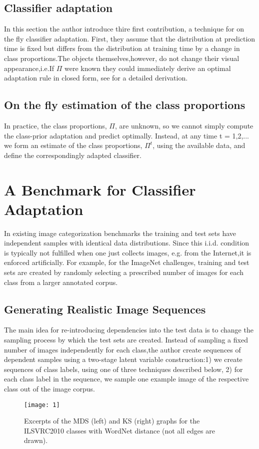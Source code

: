 \documentclass[10pt,twocolumn,letterpaper]{article}
\begin{document}
\subsection{Classifier adaptation}
In this section the author introduce thire first contribution, a technique for on the fly classifier adaptation. First, they assume that the distribution at prediction time is fixed but differs from the distribution at training time by a change in class proportions.The objects themselves,however, do not change their visual appearance,i.e.If $\Pi$ were known they could immediately derive an optimal adaptation rule in closed form, see\cite{saerens2002adjusting} for a detailed derivation.
\subsection{On the fly estimation of the class proportions}
In practice, the class proportions, $\Pi$, are unknown, so we cannot simply compute the class-prior adaptation and predict optimally. Instead, at any time t = 1,2,... we form an estimate of the class proportions, $\Pi^t$, using the available data, and define the correspondingly adapted classifier.
\section{A Benchmark for Classifier Adaptation}
In existing image categorization benchmarks the training and test sets have independent samples with identical data distributions. Since this i.i.d. condition is typically not fulfilled when one just collects images, e.g. from the Internet,it is enforced artificially. For example, for the ImageNet challenges, training and test sets are created by randomly selecting a prescribed number of images for each class from a larger annotated corpus\cite{russakovsky2015imagenet}.
\subsection{Generating Realistic Image Sequences}
The main idea for re-introducing dependencies into the test data is to change the sampling process by which the test sets are created. Instead of sampling a fixed number of images independently for each class,the author create sequences of dependent samples using a two-stage latent variable construction:1) we create sequences of class labels, using one of three techniques described below, 2) for each class label in the sequence, we sample one example image of the respective class out of the image corpus.
\begin{figure*}
\centering
\texttt{[image: 1]}
\caption{Excerpts of the MDS (left) and KS (right) graphs for the ILSVRC2010 classes with WordNet distance (not all edges are drawn).}
\label{fig:1}
\end{figure*}
\end{document}
